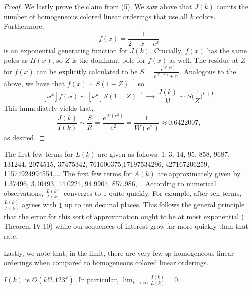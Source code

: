 \documentclass[11pt]{amsart}
\theoremstyle{definition}
\begin{document}
\begin{proof}
    We lastly prove the claim from (5).
    We saw above that $J(k)$ counts the number of homogeneous colored linear orderings that use all $k$ colors.
    Furthermore,
    \[f(x)=\frac1{2-x-e^x}\]
    is an exponential generating function for $J(k)$.
    Crucially, $f(x)$ has the same poles as $H(x)$, so $Z$ is the dominant pole for $f(x)$ as well.
    The residue at $Z$ for $f(x)$ can be explicitly calculated to be $S=\frac{-e^{W(e^2)}}{e^{W(e^2)}+e^2}$.
    Analogous to the above, we have that $f(x)\sim S(1-Z)^{-1}$ so
    \[[x^k]f(x)\sim[x^k]S(1-Z)^{-1} \implies \frac{J(k)}{k!}\sim S\Big(\frac1{Z}\Big)^{k+1}.\]
    This immediately yields that,
    \[\frac{J(k)}{I(k)}\sim \frac{S}{R}=\frac{e^{W(e^2)}}{e^2}=\frac1{W(e^2)}\approx0.6422007,\]
    as desired.
\end{proof}

The first few terms for $L(k)$ are given as follows: 1, 3, 14, 95, 858, 9687, 131244, 2074515, 37475342, 761600375,17197534296, 427167206259, 11574924994554,...
The first few terms for $A(k)$ are approximately given by 1.37496, 3.10493, 14.0224, 94.9907, 857.986,...
According to numerical observations, $\frac{L(k)}{A(k)}$ converges to $1$ quite quickly.
For example, after ten terms, $\frac{L(k)}{A(k)}$ agrees with $1$ up to ten decimal places.
This follows the general principle that the error for this sort of approximation ought to be at most exponential (\cite{AnCom} Theorem IV.10) while our sequences of interest grow far more quickly than that rate.

Lastly, we note that, in the limit, there are very few sp-homogeneous linear orderings when compared to homogeneous colored linear orderings. 

\begin{proposition}
    $I(k)$ is $O(k!2.123^k)$. In particular, $\lim_{k\to\infty}\frac{I(k)}{L(k)}=0$.
\end{proposition}
\end{document}
